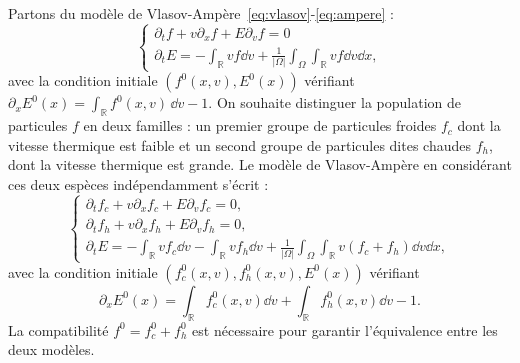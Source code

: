 Partons du modèle de Vlasov-Ampère~\eqref{eq:vlasov}-\eqref{eq:ampere} :
$$
  \begin{cases}
    \partial_t f + v\partial_x f + E\partial_v f = 0 \\
    \partial_t E = -\int_{\mathbb{R}} vf \dd{v} + \frac{1}{|\Omega|}\int_\Omega \int_{\mathbb{R}} vf \dd{v} \dd{x},
  \end{cases}
$$
avec la condition initiale $(f^0(x, v), E^0(x))$ vérifiant $\partial_x E^{0}(x) = \int_{\mathbb{R}} f^0(x, v)\,\dd{v}-1$. On souhaite distinguer la population de particules $f$ en deux familles : un premier groupe de particules froides $f_c$ dont la vitesse thermique est faible et un second groupe de particules dites chaudes $f_h$, dont la vitesse thermique est grande. Le modèle de Vlasov-Ampère en considérant ces deux espèces indépendamment s'écrit :
$$
  \begin{cases}
    \partial_t f_c + v\partial_x f_c + E\partial_v f_c = 0,  \\
    \partial_t f_h + v\partial_x f_h + E\partial_v f_h = 0,  \\
    \partial_t E = -\int_{\mathbb{R}} vf_c \dd{v} -\int_{\mathbb{R}} vf_h \dd{v}+ \frac{1}{|\Omega|}\int_\Omega \int_{\mathbb{R}} v(f_c+f_h) \dd{v}  \dd{x}, 
  \end{cases}
$$
avec la condition initiale $(f^0_{c}(x, v), f^0_{h}(x, v), E^0(x))$ vérifiant
$$
\partial_x E^0(x) = \int_{\mathbb{R}} f^0_{c}(x, v) \dd{v}+\int_{\mathbb{R}} f^0_{h}(x, v) \dd{v}-1.
$$ 
La compatibilité $f^0 = f^0_{c} + f^0_{h}$ est nécessaire pour garantir l'équivalence entre les deux modèles.

